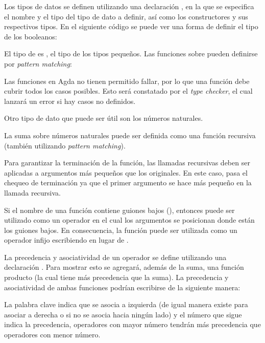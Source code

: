 Los tipos de datos se definen utilizando una declaración , en la que se especifica el nombre y el tipo del tipo de dato a definir, así como los constructores y sus respectivos tipos. En el siguiente código se puede ver una forma de definir el tipo de los booleanos:


El tipo de  es , el tipo de los tipos pequeños. Las funciones sobre  pueden definirse por \textit{pattern matching}:


Las funciones en Agda no tienen permitido fallar, por lo que una función debe cubrir todos los casos posibles. Esto será constatado por el \textit{type checker}, el cual lanzará un error si hay casos no definidos. 

Otro tipo de dato que puede ser útil son los números naturales. 


La suma sobre números naturales puede ser definida como una función recursiva (también utilizando \textit{pattern matching}). 


Para garantizar la terminación de la función, las llamadas recursivas deben ser aplicadas a argumentos más pequeños que los originales. En este caso, \AgdaFunction{\_+\_} pasa el chequeo de terminación ya que el primer argumento se hace más pequeño en la llamada recursiva. 

Si el nombre de una función contiene guiones bajos (\AgdaSymbol{\_}), entonces puede ser utilizado como un operador en el cual los argumentos se posicionan donde están los guiones bajos. En consecuencia, la función \AgdaFunction{\_+\_} puede ser utilizada como un operador infijo escribiendo  \AgdaFunction{+}  en lugar de \AgdaFunction{\_+\_} . 

La precedencia y asociatividad de un operador se define utilizando una declaración . Para mostrar esto se agregará, además de la suma, una función producto (la cual tiene más precedencia que la suma). La precedencia y asociatividad de ambas funciones podrían escribirse de la siguiente manera:


La palabra clave  indica que se asocia a izquierda (de igual manera existe  para asociar a derecha o  si no se asocia hacia ningún lado) y el número que sigue indica la precedencia, operadores con mayor número tendrán más precedencia que operadores con menor número.

